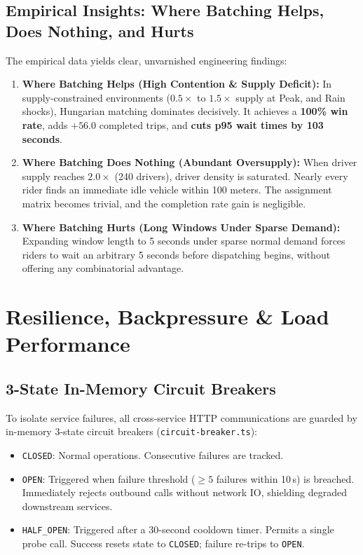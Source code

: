 \documentclass[11pt,a4paper]{article}
\begin{document}
\subsection{Empirical Insights: Where Batching Helps, Does Nothing, and Hurts}
The empirical data yields clear, unvarnished engineering findings:
\begin{enumerate}[leftmargin=1.5em]
    \item \textbf{Where Batching Helps (High Contention \& Supply Deficit):} In supply-constrained environments ($0.5\times$ to $1.5\times$ supply at Peak, and Rain shocks), Hungarian matching dominates decisively. It achieves a \textbf{100\% win rate}, adds $+56.0$ completed trips, and \textbf{cuts p95 wait times by 103 seconds}.
    \item \textbf{Where Batching Does Nothing (Abundant Oversupply):} When driver supply reaches $2.0\times$ (240 drivers), driver density is saturated. Nearly every rider finds an immediate idle vehicle within 100 meters. The assignment matrix becomes trivial, and the completion rate gain is negligible.
    \item \textbf{Where Batching Hurts (Long Windows Under Sparse Demand):} Expanding window length to 5 seconds under sparse normal demand forces riders to wait an arbitrary 5 seconds before dispatching begins, without offering any combinatorial advantage.
\end{enumerate}

\section{Resilience, Backpressure \& Load Performance}

\subsection{3-State In-Memory Circuit Breakers}
To isolate service failures, all cross-service HTTP communications are guarded by in-memory 3-state circuit breakers (\texttt{circuit-breaker.ts}):
\begin{itemize}[leftmargin=1.5em]
    \item \texttt{CLOSED}: Normal operations. Consecutive failures are tracked.
    \item \texttt{OPEN}: Triggered when failure threshold ($\ge 5$ failures within 10\,s) is breached. Immediately rejects outbound calls without network IO, shielding degraded downstream services.
    \item \texttt{HALF\_OPEN}: Triggered after a 30-second cooldown timer. Permits a single probe call. Success resets state to \texttt{CLOSED}; failure re-trips to \texttt{OPEN}.
\end{itemize}
\end{document}
